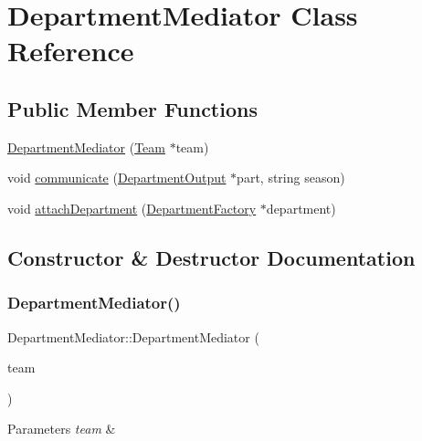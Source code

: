 \hypertarget{classDepartmentMediator}{}\section{Department\+Mediator Class Reference}
\label{classDepartmentMediator}
\subsection*{Public Member Functions}
\begin{DoxyCompactItemize}
\item 
\hyperlink{classDepartmentMediator_ae237a0b0e0ca262e2e51254be2b894d3}{Department\+Mediator} (\hyperlink{classTeam}{Team} $\ast$team)
\item 
void \hyperlink{classDepartmentMediator_a1cd1ac08b0aa2d6eb7f31b9fb20155d6}{communicate} (\hyperlink{classDepartmentOutput}{Department\+Output} $\ast$part, string season)
\item 
void \hyperlink{classDepartmentMediator_a24fa0b87c5dbcbf2868e062d599b49e3}{attach\+Department} (\hyperlink{classDepartmentFactory}{Department\+Factory} $\ast$department)
\end{DoxyCompactItemize}


\subsection{Constructor \& Destructor Documentation}
\mbox{\label{classDepartmentMediator_ae237a0b0e0ca262e2e51254be2b894d3}} 
\subsubsection{\texorpdfstring{Department\+Mediator()}{DepartmentMediator()}}
{\footnotesize\ttfamily Department\+Mediator\+::\+Department\+Mediator (\begin{DoxyParamCaption}\item[{\hyperlink{classTeam}{Team} $\ast$}]{team }\end{DoxyParamCaption})}


\begin{DoxyParams}{Parameters}
{\em team} & \\
\hline
\end{DoxyParams}


